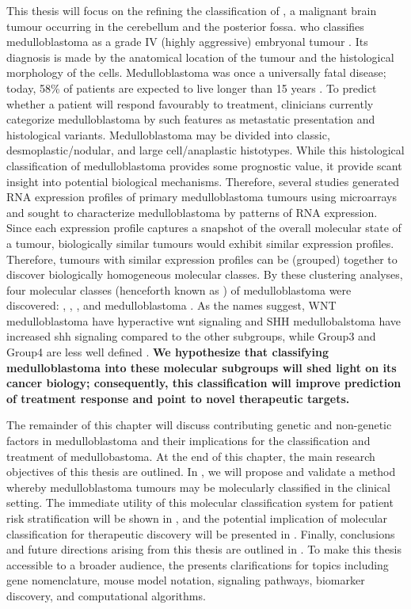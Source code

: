 This thesis will focus on the refining the classification of , a malignant brain tumour occurring in the cerebellum and the posterior fossa. \gls{who} classifies medulloblastoma as a grade IV (highly aggressive) embryonal tumour . Its diagnosis is made by the anatomical location of the tumour and the histological morphology of the cells. Medulloblastoma was once a universally fatal disease; today, 58\% of patients are expected to live longer than 15 years . To predict whether a patient will respond favourably to treatment, clinicians currently categorize medulloblastoma by such features as metastatic presentation and histological variants. Medulloblastoma may be divided into classic, desmoplastic/nodular, and large cell/anaplastic histotypes. While this histological classification of medulloblastoma provides some prognostic value, it provide scant insight into potential biological mechanisms. Therefore, several studies generated RNA expression profiles of primary medulloblastoma tumours using microarrays and sought to characterize medulloblastoma by patterns of RNA expression. Since each expression profile captures a snapshot of the overall molecular state of a tumour, biologically similar tumours would exhibit similar expression profiles. Therefore, tumours with similar expression profiles can be  (grouped) together to discover biologically homogeneous molecular classes. By these clustering analyses, four molecular classes (henceforth known as ) of medulloblastoma were discovered: , , , and  medulloblastoma . As the names suggest, WNT medulloblastoma have hyperactive \gls{wnt} signaling and SHH medullobalstoma have increased \gls{shh} signaling compared to the other subgroups, while Group3 and Group4 are less well defined . \textbf{We hypothesize that classifying medulloblastoma into these molecular subgroups will shed light on its cancer biology; consequently, this classification will improve prediction of treatment response and point to novel therapeutic targets.}

The remainder of this chapter will discuss contributing genetic and non-genetic factors in medulloblastoma and their implications for the classification and treatment of medullobastoma. At the end of this chapter, the main research objectives of this thesis are outlined. In , we will propose and validate a method whereby medulloblastoma tumours may be molecularly classified in the clinical setting. The immediate utility of this molecular classification system for patient risk stratification will be shown in , and the potential implication of molecular classification for therapeutic discovery will be presented in . Finally, conclusions and future directions arising from this thesis are outlined in . To make this thesis accessible to a broader audience, the  presents clarifications for topics including gene nomenclature, mouse model notation, signaling pathways, biomarker discovery, and computational algorithms.


